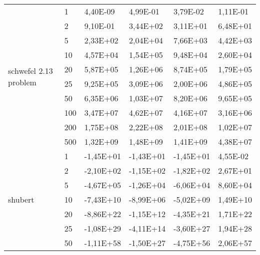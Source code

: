 \begin{longtable}[c]{|p{3.5cm}|l|l|l|l|l|}
\multirow[t]{10}{*}{schwefel 2.13 problem} & 1         & 4,40E-09   & 4,99E-01   & 3,79E-02   & 1,11E-01  \\ \cline{2-6} 
                                        & 2         & 9,10E-01   & 3,44E+02   & 3,11E+01   & 6,48E+01  \\ \cline{2-6} 
                                        & 5         & 2,33E+02   & 2,04E+04   & 7,66E+03   & 4,42E+03  \\ \cline{2-6} 
                                        & 10        & 4,57E+04   & 1,54E+05   & 9,48E+04   & 2,60E+04  \\ \cline{2-6} 
                                        & 20        & 5,87E+05   & 1,26E+06   & 8,74E+05   & 1,79E+05  \\ \cline{2-6} 
                                        & 25        & 9,25E+05   & 3,09E+06   & 2,00E+06   & 4,86E+05  \\ \cline{2-6} 
                                        & 50        & 6,35E+06   & 1,03E+07   & 8,20E+06   & 9,65E+05  \\ \cline{2-6} 
                                        & 100       & 3,47E+07   & 4,62E+07   & 4,16E+07   & 3,16E+06  \\ \cline{2-6} 
                                        & 200       & 1,75E+08   & 2,22E+08   & 2,01E+08   & 1,02E+07  \\ \cline{2-6} 
                                        & 500       & 1,32E+09   & 1,48E+09   & 1,41E+09   & 4,38E+07  \\ \hline
\multirow[t]{10}{*}{shubert}               & 1         & -1,45E+01  & -1,43E+01  & -1,45E+01  & 4,55E-02  \\ \cline{2-6} 
                                        & 2         & -2,10E+02  & -1,15E+02  & -1,82E+02  & 2,67E+01  \\ \cline{2-6} 
                                        & 5         & -4,67E+05  & -1,26E+04  & -6,06E+04  & 8,60E+04  \\ \cline{2-6} 
                                        & 10        & -7,43E+10  & -8,99E+06  & -5,02E+09  & 1,49E+10  \\ \cline{2-6} 
                                        & 20        & -8,86E+22  & -1,15E+12  & -4,35E+21  & 1,71E+22  \\ \cline{2-6} 
                                        & 25        & -1,08E+29  & -4,11E+14  & -3,60E+27  & 1,94E+28  \\ \cline{2-6} 
                                        & 50        & -1,11E+58  & -1,50E+27  & -4,75E+56  & 2,06E+57  \\ \cline{2-6} 

\end{longtable}
